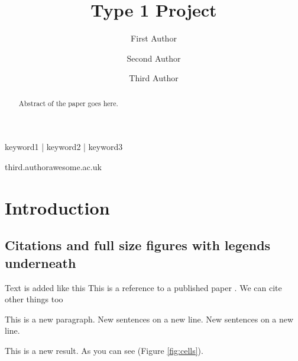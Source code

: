 
\title{Type 1 Project}

\author[1,2]{First Author}
\author[1,3]{Second Author}
\author[1,4,\Letter]{Third Author}
\date{}

\maketitle

\begin{abstract}
Abstract of the paper goes here.
\lipsum[1]
\end{abstract}

\begin{keywords}
keyword1 | keyword2 | keyword3
\end{keywords}

\begin{corrauthor}
third.author\at awesome.ac.uk
\end{corrauthor}

\section*{Introduction}\label{s:introduction}


\subsection*{Citations and full size figures with legends underneath}

Text is added like this
This is a reference to a published paper \citep{watson_molecular_1953}.
We can cite other things too \citep{tipton_complexities_2019,zheng_genome_2011,alberts_molecular_2002}

This is a new paragraph.
New sentences on a new line.
New sentences on a new line.

This is a new result.
As you can see (Figure \ref{fig:cells}).


